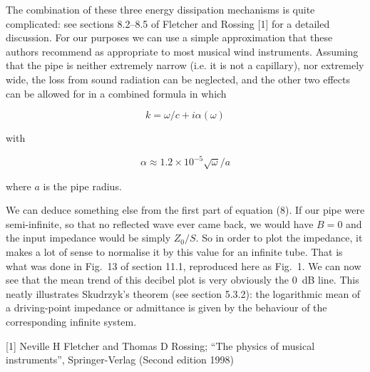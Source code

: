   The combination of these three energy dissipation mechanisms is quite 
  complicated: see sections 8.2--8.5 of Fletcher and Rossing [1] for a detailed 
  discussion. For our purposes we can use a simple approximation that these 
  authors recommend as appropriate to most musical wind instruments. Assuming 
  that the pipe is neither extremely narrow (i.e. it is not a capillary), nor 
  extremely wide, the loss from sound radiation can be neglected, and the other 
  two effects can be allowed for in a combined formula in which 

  \begin{equation*}k=\omega/c+i \alpha(\omega) \tag{9}\end{equation*} 

  \noindent{}with 

  \begin{equation*} \alpha \approx 1.2 \times 10^{-5} \sqrt{\omega}/a 
  \tag{10}\end{equation*} 

  \noindent{}where $a$ is the pipe radius. 

  We can deduce something else from the first part of equation (8). If our pipe 
  were semi-infinite, so that no reflected wave ever came back, we would have 
  $B=0$ and the input impedance would be simply $Z_0/S$. So in order to plot 
  the impedance, it makes a lot of sense to normalise it by this value for an 
  infinite tube. That is what was done in Fig.\ 13 of section 11.1, reproduced 
  here as Fig.\ 1. We can now see that the mean trend of this decibel plot is 
  very obviously the 0 dB line. This neatly illustrates Skudrzyk's theorem (see 
  section 5.3.2): the logarithmic mean of a driving-point impedance or 
  admittance is given by the behaviour of the corresponding infinite system. 


  \sectionreferences{}[1] Neville H Fletcher and Thomas D Rossing; “The physics 
  of musical instruments”, Springer-Verlag (Second edition 1998) 